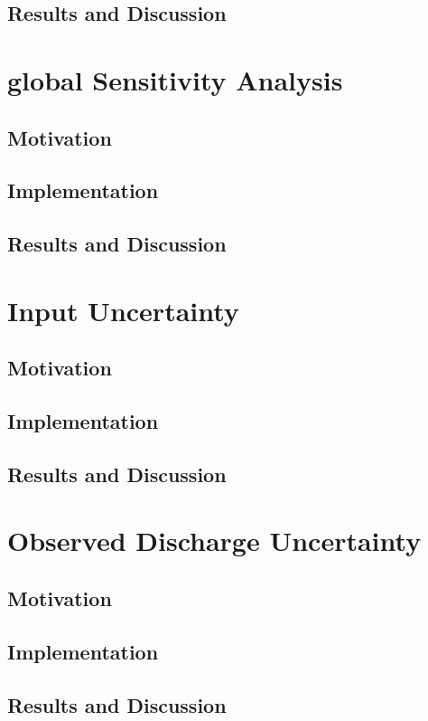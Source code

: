 \documentclass[12pt]{scrartcl}
\begin{document}
    \subsection{Results and Discussion}
        
        
\section{global Sensitivity Analysis}
    \subsection{Motivation}
        
    \subsection{Implementation}
        
    \subsection{Results and Discussion}
        

\section{Input Uncertainty}
    \subsection{Motivation}
        
    \subsection{Implementation}
        
    \subsection{Results and Discussion}
        
    
\section{Observed Discharge Uncertainty}
    \subsection{Motivation}
        
    \subsection{Implementation}
        
    \subsection{Results and Discussion}
        
    

\newpage
\printbibliography
\end{document}
